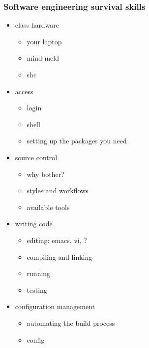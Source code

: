 %
%
%
%


% 
\begin{frame}[fragile]
%
  \frametitle{Software engineering survival skills}
%
  \begin{itemize}
%
  \item class hardware
    \begin{itemize}
    \item your laptop
    \item mind-meld
    \item shc
    \end{itemize}
%
  \item access
    \begin{itemize}
    \item login
    \item shell
    \item setting up the packages you need
    \end{itemize}
%
  \item source control
    \begin{itemize}
    \item why bother?
    \item styles and workflows
    \item available tools
    \end{itemize}
%
  \item writing code
    \begin{itemize}
    \item editing: emacs, vi, ?
    \item compiling and linking
    \item running
    \item testing
    \end{itemize}
%
  \item configuration management
    \begin{itemize}
    \item automating the build process
    \item config
    \end{itemize}
%
  \end{itemize}
%
\end{frame}


